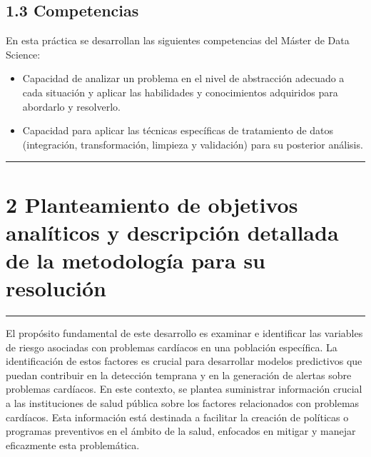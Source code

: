 \documentclass[
]{article}
\providecommand{\tightlist}{%
  \setlength{\itemsep}{0pt}\setlength{\parskip}{0pt}}
\begin{document}
\hypertarget{competencias}{%
\subsection{1.3 Competencias}\label{competencias}}

En esta práctica se desarrollan las siguientes competencias del Máster
de Data Science:

\begin{itemize}
\tightlist
\item
  Capacidad de analizar un problema en el nivel de abstracción adecuado
  a cada situación y aplicar las habilidades y conocimientos adquiridos
  para abordarlo y resolverlo.
\item
  Capacidad para aplicar las técnicas específicas de tratamiento de
  datos (integración, transformación, limpieza y validación) para su
  posterior análisis.
\end{itemize}

\begin{center}\rule{0.5\linewidth}{0.5pt}\end{center}

\hypertarget{planteamiento-de-objetivos-analuxedticos-y-descripciuxf3n-detallada-de-la-metodologuxeda-para-su-resoluciuxf3n}{%
\section{2 Planteamiento de objetivos analíticos y descripción detallada
de la metodología para su
resolución}\label{planteamiento-de-objetivos-analuxedticos-y-descripciuxf3n-detallada-de-la-metodologuxeda-para-su-resoluciuxf3n}}

\begin{center}\rule{0.5\linewidth}{0.5pt}\end{center}

El propósito fundamental de este desarrollo es examinar e identificar
las variables de riesgo asociadas con problemas cardíacos en una
población específica. La identificación de estos factores es crucial
para desarrollar modelos predictivos que puedan contribuir en la
detección temprana y en la generación de alertas sobre problemas
cardíacos. En este contexto, se plantea suministrar información crucial
a las instituciones de salud pública sobre los factores relacionados con
problemas cardíacos. Esta información está destinada a facilitar la
creación de políticas o programas preventivos en el ámbito de la salud,
enfocados en mitigar y manejar eficazmente esta problemática.
\end{document}
